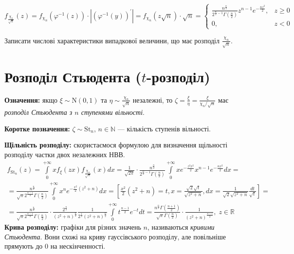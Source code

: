 \begin{equation*}
    f_{\frac{\chi_n}{\sqrt{n}}}(z) = f_{\chi_n}\left(\varphi^{-1} (z)\right) \cdot \left|\left(\varphi^{-1} (y) \right)^{\prime}\right| =
f_{\chi_n}(z \sqrt{n}) \cdot \sqrt{n} = 
\begin{cases}
    \frac{n^{\frac{n}{2}}}{2^{\frac{n}{2} - 1} \Gamma\left(\frac{n}{2}\right)} z^{n-1} e^{-\frac{nz^2}{2}}, & z \geq 0 \\
    0, & z < 0
\end{cases}
\end{equation*}
\begin{exercise}
    Записати числові характеристики випадкової величини, що має розподіл $\frac{\chi_n}{\sqrt{n}}$.
\end{exercise}

\section{Розподіл Стьюдента (\texorpdfstring{$t$}{t}-розподіл)}
\noindent\textbf{Означення:} якщо $\xi \sim \mathrm{N}(0, 1)$ та $\eta \sim \frac{\chi_n}{\sqrt{n}}$ незалежні,
то $\zeta = \frac{\xi}{\eta} = \frac{\xi}{\chi_n /\sqrt{n}}$ має \emph{розподіл Стьюдента з $n$ ступенями вільності}.

\noindent\textbf{Коротке позначення:} $\zeta \sim \mathrm{St}_n$, $n\in\mathbb{N}$ --- кількість ступенів вільності.

\noindent\textbf{Щільність розподілу:} скористаємося формулою для визначення щільності розподілу частки
двох незалежних НВВ.
\begin{gather*}
    f_{\mathrm{St}_n} (z) = \int\limits_0^{+\infty} x f_{\xi}(z x) f_{\frac{\chi_n}{\sqrt{n}}} (x) dx =
    \frac{1}{\sqrt{2\pi}} \cdot \frac{n^{\frac{n}{2}}}{2^{\frac{n}{2} - 1} \Gamma\left(\frac{n}{2}\right)}
    \int\limits_0^{+\infty} x e^{-\frac{z^2 x^2}{2}} x^{n-1} e^{-\frac{nx^2}{2}} dx = \\
    = \frac{n^{\frac{n}{2}}}{\sqrt{\pi} 2^{\frac{n-1}{2}} \Gamma\left(\frac{n}{2}\right)}
    \int\limits_0^{+\infty} x^n e^{-\frac{x^2}{2}(z^2+n)} dx = 
    \left[ \frac{x^2}{2} (z^2 + n) = t, x = \frac{\sqrt{2} \sqrt{t}}{\sqrt{z^2 + n}},
    dx = \frac{1}{\sqrt{2}\sqrt{z^2 + n}} \frac{dt}{\sqrt{t}}\right] = \\
    = \frac{n^{\frac{n}{2}}}{\sqrt{\pi} 2^{\frac{n-1}{2}} \Gamma\left(\frac{n}{2}\right)} \cdot
    \frac{2^{\frac{n}{2}}}{(z^2 + n)^{\frac{n}{2}}} \frac{1}{2^{\frac{1}{2}}(z^2 + n)^{\frac{n}{2}}}
    \int\limits_0^{+\infty} t^{\frac{n-1}{2}} e^{-t} dt = 
    \frac{n^{\frac{n}{2}} \Gamma\left(\frac{n+1}{2}\right)}{\sqrt{\pi} \Gamma\left(\frac{n}{2}\right)} \cdot
    \frac{1}{(z^2 + n)^{\frac{n+1}{2}}}, \; z \in \mathbb{R}
\end{gather*}
\noindent \textbf{Крива розподілу:} графіки для різних значень $n$, називаються \emph{кривими Стьюдента}.
Вони схожі на криву гауссівського розподілу, але повільніше прямують до 0 на нескінченності.

